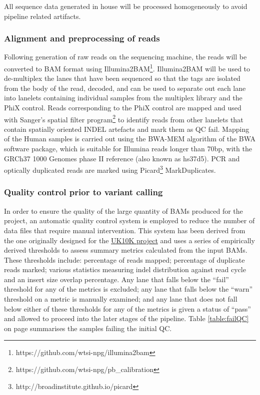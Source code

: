 
All sequence data generated in house will be processed homogeneously to avoid pipeline related artifacts.

\subsubsection{Alignment and preprocessing of reads}
Following generation of raw reads on the sequencing machine, the reads will be converted to BAM format using Illumina2BAM\footnote{https://github.com/wtsi-npg/illumina2bam}. Illumina2BAM will be used to de-multiplex the lanes that have been sequenced so that the tags are isolated from the body of the read, decoded, and can be used to separate out each lane into lanelets containing individual samples from the multiplex library and the PhiX control.  Reads corresponding to the PhiX control are mapped and used with Sanger’s spatial filter program\footnote{https://github.com/wtsi-npg/pb\_calibration} to identify reads from other lanelets that contain spatially oriented INDEL artefacts and mark them as QC fail. Mapping  of the Human samples is carried out using the BWA-MEM algorithm of the BWA software package, which is suitable for Illumina reads longer than 70bp\cite{2013arXiv1303.3997L}, with the GRCh37 1000 Genomes phase II reference (also known as hs37d5). PCR and optically duplicated reads are marked using Picard\footnote{http://broadinstitute.github.io/picard} MarkDuplicates.

\subsubsection{Quality control prior to variant calling}
In order to ensure the quality of the large quantity of BAMs produced for the project, an automatic quality control system is employed to reduce the number of data files that require manual intervention. This system has been derived from the one originally designed for the \href{http://www.uk10k.org}{UK10K  project} and uses a series of empirically derived thresholds to assess summary metrics calculated from the input BAMs. These thresholds include: percentage of reads mapped; percentage of duplicate reads marked; various statistics measuring indel distribution against read cycle and an insert size overlap percentage. Any lane that falls below the “fail” threshold for any of the metrics is excluded; any lane that falls below the “warn” threshold on a metric is manually examined; and any lane that does not fall below either of these thresholds for any of the metrics is given a status of “pass” and allowed to proceed into the later stages of the pipeline.
Table \ref{table:failQC} on page \pageref{table:failQC} summarises the samples failing the initial QC.


